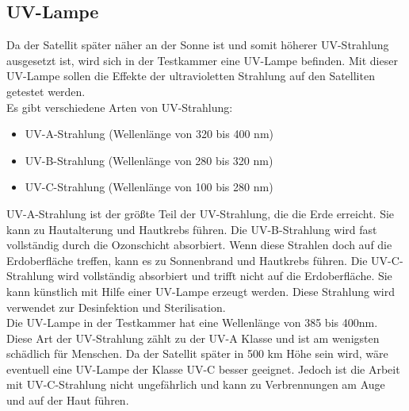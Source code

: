 \subsection{UV-Lampe}\label{sec:UV-Lampe}
Da der Satellit später näher an der Sonne ist und somit höherer UV-Strahlung ausgesetzt ist, wird sich in der Testkammer eine UV-Lampe befinden. Mit dieser UV-Lampe sollen die Effekte der ultravioletten Strahlung auf den Satelliten getestet werden.\\
\vspace{2mm}
Es gibt verschiedene Arten von UV-Strahlung: 
\begin{itemize}
    \item UV-A-Strahlung (Wellenlänge von 320 bis 400 nm)
    \item UV-B-Strahlung (Wellenlänge von 280 bis 320 nm)
    \item UV-C-Strahlung (Wellenlänge von 100 bis 280 nm)
\end{itemize}
\vspace{2mm}
UV-A-Strahlung ist der größte Teil der UV-Strahlung, die die Erde erreicht. Sie kann zu Hautalterung und Hautkrebs führen. Die UV-B-Strahlung wird fast vollständig durch die Ozonschicht absorbiert. Wenn diese Strahlen doch auf die Erdoberfläche treffen, kann es zu Sonnenbrand und Hautkrebs führen. Die UV-C-Strahlung wird vollständig absorbiert und trifft nicht auf die Erdoberfläche. Sie kann künstlich mit Hilfe einer UV-Lampe erzeugt werden. Diese Strahlung wird verwendet zur Desinfektion und Sterilisation.\\
\vspace{3mm}
Die UV-Lampe\autocite{UV-Lampe} in der Testkammer hat eine Wellenlänge von 385 bis 400nm. Diese Art der UV-Strahlung zählt zu der UV-A Klasse und ist am wenigsten schädlich für Menschen. Da der Satellit später in 500 km Höhe sein wird, wäre eventuell eine UV-Lampe der Klasse UV-C besser geeignet. Jedoch ist die Arbeit mit UV-C-Strahlung nicht ungefährlich und kann zu Verbrennungen am Auge und auf der Haut führen.\\
\vspace{4mm}

